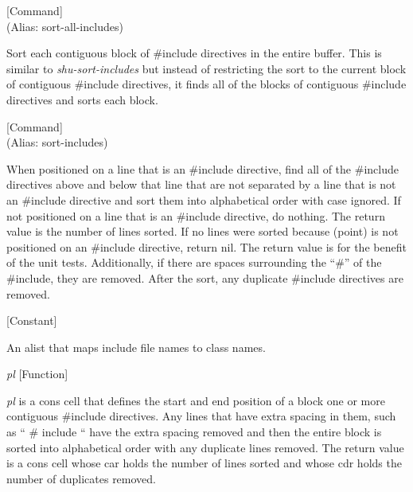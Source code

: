 \vspace{1em}
\noindent
{}
\usebox{\funcname}
 \hfill [Command]\\%
 (Alias: sort-all-includes)

\begin{doc-string}
Sort each contiguous block of \#include directives in the entire buffer.  This
is similar to \emph{shu-sort-includes} but instead of restricting the sort to the
current block of contiguous \#include directives, it finds all of the blocks of
contiguous \#include directives and sorts each block.
\end{doc-string}

\vspace{1em}
\noindent
{}
\usebox{\funcname}
 \hfill [Command]\\%
 (Alias: sort-includes)

\begin{doc-string}
When positioned on a line that is an \#include directive, find all of the
\#include directives above and below that line that are not separated by a line
that is not an \#include directive and sort them into alphabetical order with
case ignored.  If not positioned on a line that is an \#include directive, do
nothing.  The return value is the number of lines sorted.  If no lines were
sorted because (point) is not positioned on an \#include directive, return nil.
The return value is for the benefit of the unit tests.  Additionally, if there
are spaces surrounding the ``\#'' of the \#include, they are removed.  After the
sort, any duplicate \#include directives are removed.
\end{doc-string}

\vspace{1em}
\noindent
{}
\usebox{\funcname}
 \hfill [Constant]

\begin{doc-string}
An alist that maps include file names to class names.
\end{doc-string}

\vspace{1em}
\noindent
{}
\usebox{\funcname}\emph{pl}
 \hfill [Function]

\begin{doc-string}
\emph{pl} is a cons cell that defines the start and end position of a block one or
more contiguous \#include directives.  Any lines that have extra spacing in them,
such as `` \# include `` have the extra spacing removed and then the entire block
is sorted into alphabetical order with any duplicate lines removed.  The return
value is a cons cell whose car holds the number of lines sorted and whose cdr
holds the number of duplicates removed.
\end{doc-string}

